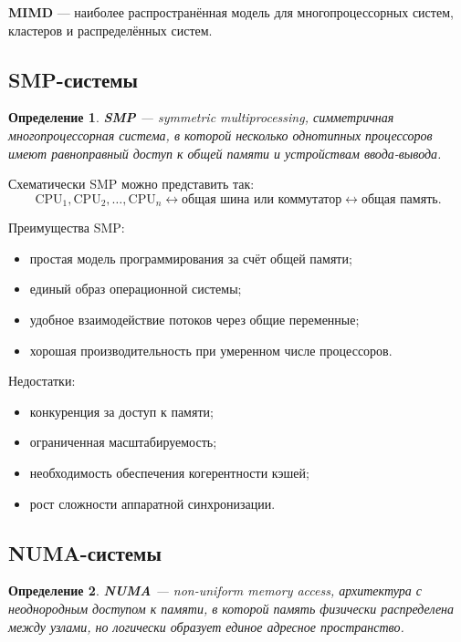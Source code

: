 \documentclass[12pt,a4paper]{article}
\newtheorem{definition}{Определение}
\begin{document}
\textbf{MIMD} --- наиболее распространённая модель для многопроцессорных систем, кластеров и распределённых систем.

\subsection{SMP-системы}

\begin{definition}
\textbf{SMP} --- symmetric multiprocessing, симметричная многопроцессорная система, в которой несколько однотипных процессоров имеют равноправный доступ к общей памяти и устройствам ввода-вывода.
\end{definition}

Схематически SMP можно представить так:
\[
\text{CPU}_1,\text{CPU}_2,\ldots,\text{CPU}_n
\longleftrightarrow
\text{общая шина или коммутатор}
\longleftrightarrow
\text{общая память}.
\]

Преимущества SMP:
\begin{itemize}
    \item простая модель программирования за счёт общей памяти;
    \item единый образ операционной системы;
    \item удобное взаимодействие потоков через общие переменные;
    \item хорошая производительность при умеренном числе процессоров.
\end{itemize}

Недостатки:
\begin{itemize}
    \item конкуренция за доступ к памяти;
    \item ограниченная масштабируемость;
    \item необходимость обеспечения когерентности кэшей;
    \item рост сложности аппаратной синхронизации.
\end{itemize}

\subsection{NUMA-системы}

\begin{definition}
\textbf{NUMA} --- non-uniform memory access, архитектура с неоднородным доступом к памяти, в которой память физически распределена между узлами, но логически образует единое адресное пространство.
\end{definition}
\end{document}
